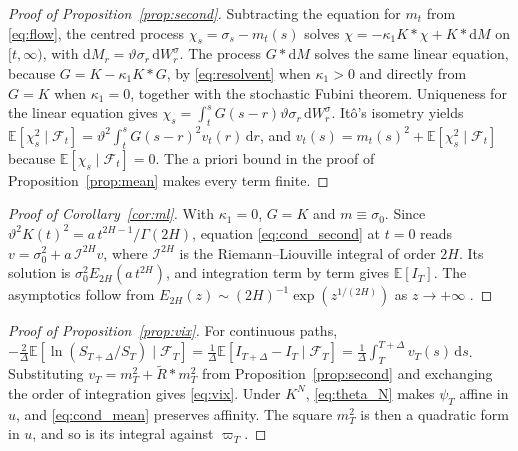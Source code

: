 \documentclass{rQUF2e}
\theoremstyle{plain}
\theoremstyle{definition}
\theoremstyle{remark}
\newcommand{\D}{\mathrm{d}}
\newcommand{\E}{\mathbb{E}}
\newcommand{\F}{\mathcal{F}}
\begin{document}
\begin{proof}[Proof of Proposition~\ref{prop:second}] Subtracting the equation for $m_t$ from \eqref{eq:flow}, the centred process $\chi_s=\sigma_s-m_t(s)$ solves $\chi=-\kappa_1K*\chi+K*\D M$ on $[t,\infty)$, with $\D M_r=\vartheta\sigma_r\,\D W^\sigma_r$. The process $G*\D M$ solves the same linear equation, because $G=K-\kappa_1K*G$, by \eqref{eq:resolvent} when $\kappa_1>0$ and directly from $G=K$ when $\kappa_1=0$, together with the stochastic Fubini theorem. Uniqueness for the linear equation gives $\chi_s=\int_t^sG(s-r)\vartheta\sigma_r\,\D W^\sigma_r$. It\^o's isometry yields $\E[\chi_s^2\mid\F_t]=\vartheta^2\int_t^sG(s-r)^2v_t(r)\,\D r$, and $v_t(s)=m_t(s)^2+\E[\chi_s^2\mid\F_t]$ because $\E[\chi_s\mid\F_t]=0$. The a priori bound in the proof of Proposition~\ref{prop:mean} makes every term finite. \end{proof}

\begin{proof}[Proof of Corollary~\ref{cor:ml}] With $\kappa_1=0$, $G=K$ and $m\equiv\sigma_0$. Since $\vartheta^2K(t)^2=a\,t^{2H-1}/\Gamma(2H)$, equation \eqref{eq:cond_second} at $t=0$ reads $v=\sigma_0^2+a\,\mathcal{I}^{2H}v$, where $\mathcal{I}^{2H}$ is the Riemann--Liouville integral of order $2H$. Its solution is $\sigma_0^2E_{2H}(a\,t^{2H})$, and integration term by term gives $\E[I_T]$. The asymptotics follow from $E_{2H}(z)\sim(2H)^{-1}\exp(z^{1/(2H)})$ as $z\to+\infty$ \citep{GorenfloKilbasMainardiRogosin2014}. \end{proof}

\begin{proof}[Proof of Proposition~\ref{prop:vix}] For continuous paths, $-\tfrac2\Delta\E[\ln(S_{T+\Delta}/S_T)\mid\F_T]=\tfrac1\Delta\E[I_{T+\Delta}-I_T\mid\F_T]=\tfrac1\Delta\int_T^{T+\Delta}v_T(s)\,\D s$. Substituting $v_T=m_T^2+\widetilde R*m_T^2$ from Proposition~\ref{prop:second} and exchanging the order of integration gives \eqref{eq:vix}. Under $K^N$, \eqref{eq:theta_N} makes $\psi_T$ affine in $u$, and \eqref{eq:cond_mean} preserves affinity. The square $m_T^2$ is then a quadratic form in $u$, and so is its integral against $\varpi_T$. \end{proof}
\end{document}
